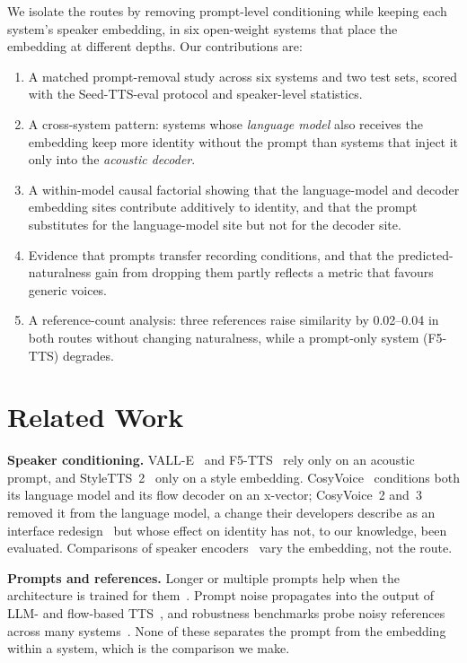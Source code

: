 \documentclass{Interspeech}
\begin{document}
We isolate the routes by removing prompt-level conditioning while keeping each system's speaker embedding, in six open-weight systems that place the embedding at different depths.
Our contributions are:
\begin{enumerate}
  \item A matched prompt-removal study across six systems and two test sets, scored with the Seed-TTS-eval protocol and speaker-level statistics.
  \item A cross-system pattern: systems whose \emph{language model} also receives the embedding keep more identity without the prompt than systems that inject it only into the \emph{acoustic decoder}.
  \item A within-model causal factorial showing that the language-model and decoder embedding sites contribute additively to identity, and that the prompt substitutes for the language-model site but not for the decoder site.
  \item Evidence that prompts transfer recording conditions, and that the predicted-naturalness gain from dropping them partly reflects a metric that favours generic voices.
  \item A reference-count analysis: three references raise similarity by 0.02--0.04 in both routes without changing naturalness, while a prompt-only system (F5-TTS) degrades.
\end{enumerate}

\section{Related Work}
\label{sec:related}

\textbf{Speaker conditioning.}
VALL-E~\cite{valle} and F5-TTS~\cite{f5tts} rely only on an acoustic prompt, and StyleTTS~2~\cite{styletts2} only on a style embedding.
CosyVoice~\cite{cosyvoice} conditions both its language model and its flow decoder on an x-vector; CosyVoice~2 and~3~\cite{cosyvoice2,cosyvoice3} removed it from the language model, a change their developers describe as an interface redesign~\cite{chen2026bottleneck} but whose effect on identity has not, to our knowledge, been evaluated.
Comparisons of speaker encoders~\cite{yourtts} vary the embedding, not the route.

\textbf{Prompts and references.}
Longer or multiple prompts help when the architecture is trained for them~\cite{megatts2,lei2023multiscale,pfluxtts}.
Prompt noise propagates into the output of LLM- and flow-based TTS~\cite{lu2025noise,wang2024noise}, and robustness benchmarks probe noisy references across many systems~\cite{rvcbench}.
None of these separates the prompt from the embedding within a system, which is the comparison we make.
\end{document}
